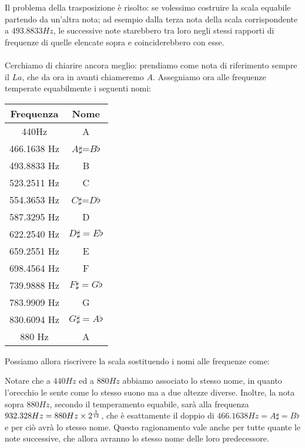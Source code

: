 \documentclass[12pt,a4paper]{book}
\theoremstyle{definition}
\theoremstyle{Theorem}
\theoremstyle{definition}
\theoremstyle{definition}
\theoremstyle{definition}
\begin{document}
	 Il problema della trasposizione è risolto: se volessimo costruire la scala equabile partendo da un'altra nota; ad esempio dalla terza nota della scala corrispondente a $493.8833 Hz$, le successive note starebbero tra loro negli stessi rapporti di frequenze di quelle elencate sopra e coinciderebbero con esse.\\
	 \\
	 Cerchiamo di chiarire ancora meglio: prendiamo come nota di riferimento sempre il $La$, che da ora in avanti chiameremo $A$. Assegniamo ora alle frequenze temperate equabilmente i seguenti nomi:
	 \begin{center}
	 	\begin{tabular}{||c|c||}
	 		\hline 
	 		Frequenza & Nome\\
	 		\hline
	 		440Hz&A\\
	 		\hline 
	 		466.1638 Hz&$A\sharp$=$B\flat$\\
	 		\hline 
	 		493.8833 Hz&B\\
	 		\hline
	 		523.2511 Hz&C\\
	 		\hline
	 		554.3653 Hz&$C\sharp$=$D\flat$\\
	 		\hline 
	 		587.3295 Hz&D\\
	 		\hline
	 		622.2540 Hz&$D\sharp=E\flat$\\
	 		\hline
	 		659.2551 Hz&E\\
	 		\hline
	 		698.4564 Hz&F\\
	 		\hline
	 		739.9888 Hz&$F\sharp=G\flat$\\
	 		\hline
	 		783.9909 Hz&G\\
	 		\hline 
	 		830.6094 Hz&$G\sharp=A\flat$\\
	 		\hline 880 Hz &A\\
	 		\hline
	 	\end{tabular}
	 \end{center}
	 Possiamo allora riscrivere la scala sostituendo i nomi alle frequenze come:
	 \begin{center}
	 \end{center}
	 Notare che a $440Hz$ ed a $880Hz$ abbiamo associato lo stesso nome, in quanto l'orecchio le sente come lo stesso suono ma a due altezze diverse. Inoltre, la nota sopra $880Hz$, secondo il temperamento equabile, sarà alla frequenza $932.328 Hz=880 Hz\times 2^{1\over 12}$, che è esattamente il doppio di $466.1638 Hz=A\sharp=B\flat$ e per ciò avrà lo stesso nome. Questo ragionamento vale anche per tutte quante le note successive, che allora avranno lo stesso nome delle loro predecessore.\\
\end{document}

